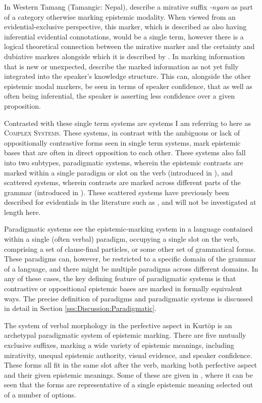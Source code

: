In Western Tamang (Tamangic: Nepal),  describe a mirative suffix \textit{-nyam} as part of a category otherwise marking epistemic modality. When viewed from an evidential-exclusive perspective, this marker, which is described as also having inferential evidential connotations, would be a single term, however there is a logical theoretical connection between the mirative marker and the certainty and dubiative markers alongside which it is described by . In marking information that is new or unexpected,  describe the marked information as not yet fully integrated into the speaker's knowledge structure. This can, alongside the other epistemic modal markers, be seen in terms of speaker confidence, that as well as often being inferential, the speaker is asserting less confidence over a given proposition.

Contrasted with these single term systems are systems I am referring to here as \textsc{Complex Systems}. These systems, in contrast with the ambiguous or lack of oppositionally contrastive forms seen in single term systems, mark epistemic bases that are often in direct opposition to each other. These systems also fall into two subtypes, paradigmatic systems, wherein the epistemic contrasts are marked within a single paradigm or slot on the verb (introduced in ), and scattered systems, wherein contrasts are marked across different parts of the grammar (introduced in ). These scattered systems have previously been described for evidentials in the literature such as , and will not be investigated at length here.

Paradigmatic systems see the epistemic-marking system in a language contained within a single (often verbal) paradigm, occupying a single slot on the verb, comprising a set of clause-final particles, or some other set of grammatical forms. These paradigms can, however, be restricted to a specific domain of the grammar of a language, and there might be multiple paradigms across different domains. In any of these cases, the key defining feature of paradigmatic systems is that contrastive or oppositional epistemic bases are marked in formally equivalent ways. The precise definition of paradigms and paradigmatic systems is discussed in detail in Section \ref{sss:Discussion:Paradigmatic}.

The system of verbal morphology in the perfective aspect in Kurtöp \cite[East Bodish: Bhutan,][]{Hyslop2018} is an archetypal paradigmatic system of epistemic marking. There are five mutually exclusive suffixes, marking a wide variety of epistemic meanings, including mirativity, unequal epistemic authority, visual evidence, and speaker confidence. These forms all fit in the same slot after the verb, marking both perfective aspect and their given epistemic meanings. Some of these are given in , where it can be seen that the forms are representative of a single epistemic meaning selected out of a number of options.

